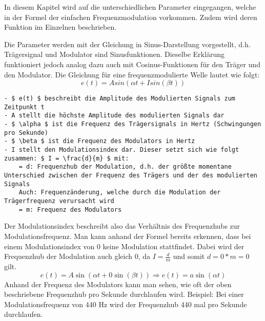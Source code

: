 In diesem Kapitel wird auf die unterschiedlichen Parameter eingegangen, welche in der Formel der einfachen Frequenzmodulation vorkommen. Zudem wird deren Funktion im Einzelnen beschrieben.

Die Parameter werden mit der Gleichung in Sinus-Darstellung vorgestellt, d.h. Trägersignal und Modulator sind Sinusfunktionen. Dieselbe Erklärung funktioniert jedoch analog dazu auch mit Cosinus-Funktionen für den Träger und den Modulator.
Die Gleichung für eine frequenzmodulierte Welle lautet wie folgt:
\[ e(t) = A sin(\alpha t + I sin(\beta t)) \]

\begin{lstlisting}[mathescape]
- $ e(t) $ beschreibt die Amplitude des Modulierten Signals zum Zeitpunkt t
- A stellt die höchste Amplitude des modulierten Signals dar
- $ \alpha $ ist die Frequenz des Trägersignals in Hertz (Schwingungen pro Sekunde)
- $ \beta $ ist die Frequenz des Modulators in Hertz
- I stellt den Modulationsindex dar. Dieser setzt sich wie folgt zusammen: $ I = \frac{d}{m} $ mit:
	= d: Frequenzhub der Modulation, d.h. der größte momentane Unterschied zwischen der Frequenz des Trägers und der des modulierten Signals
	Auch: Frequenzänderung, welche durch die Modulation der Trägerfrequenz verursacht wird
	= m: Frequenz des Modulators
\end{lstlisting} \cite{chowningPaper}

Der Modulationsindex beschreibt also das Verhältnis des Frequenzhubs zur Modulationsfrequenz.
Man kann anhand der Formel bereits erkennen, dass bei einem Modulationsindex von 0 keine Modulation stattfindet. Dabei wird der Frequenzhub der Modulation auch gleich 0, da $ I=\frac{d}{m} $ und somit $ d = 0*m = 0 $ gilt. 
\[ e(t) = A \sin(\alpha t + 0 \sin(\beta t))  \Rightarrow  e(t) = a \sin(\alpha t) \]
Anhand der Frequenz des Modulators kann man sehen, wie oft der oben beschriebene Frequenzhub pro Sekunde durchlaufen wird. Beispiel: Bei einer Modulationsfrequenz von 440 Hz wird der Frequenzhub 440 mal pro Sekunde durchlaufen.
